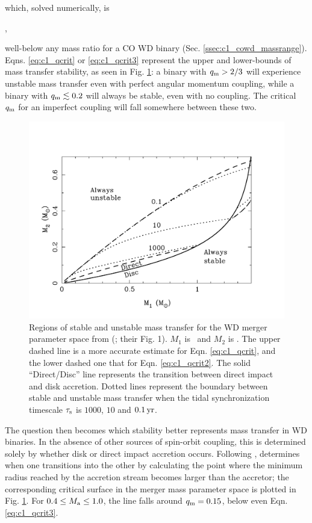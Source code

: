 \noindent which, solved numerically, is

\eqbegin
\qm{},
\label{eq:c1_qcrit3}
\eqend

\noindent well-below any mass ratio for a CO WD binary (Sec. \ref{ssec:c1_cowd_massrange}).  Eqns. \ref{eq:c1_qcrit} or \ref{eq:c1_qcrit3} represent the upper and lower-bounds of mass transfer stability, as seen in Fig. \ref{fig:c1_stability}: a binary with $\qm > 2/3$ will experience unstable mass transfer even with perfect angular momentum coupling, while a binary with $\qm \lesssim 0.2$ will always be stable, even with no coupling.  The critical $\qm$ for an imperfect coupling will fall somewhere between these two.

\begin{figure}
\centering
\includegraphics[angle=0,width=0.65\columnwidth]{introduction/figures/marsns04_stab.pdf}
\caption{Regions of stable and unstable mass transfer for the WD merger parameter space from \citeauthor{marsns04} (\citeyear{marsns04}; their Fig. 1).  $M_1$ is \Ma\, and $M_2$ is \Md.  The upper dashed line is a more accurate estimate for Eqn. \ref{eq:c1_qcrit}, and the lower dashed one that for Eqn. \ref{eq:c1_qcrit2}.  The solid ``Direct/Disc'' line represents the transition between direct impact and disk accretion.  Dotted lines represent the boundary between stable and unstable mass transfer when the tidal synchronization timescale $\tau_\mathrm{s}$ is $1000$, $10$ and $0.1\,\mathrm{yr}$.}
\label{fig:c1_stability}
\end{figure}

The question then becomes which stability better represents mass transfer in WD binaries.  In the absence of other sources of spin-orbit coupling, this is determined solely by whether disk or direct impact accretion occurs.  Following \cite{lubos75}, \cite{nele+01} determines when one transitions into the other by calculating the point where the minimum radius reached by the accretion stream becomes larger than the accretor; the corresponding critical surface in the merger mass parameter space is plotted in Fig. \ref{fig:c1_stability}.  For $0.4 \leq \Ma \leq 1.0$, the line falls around $\qm = 0.15$, below even Eqn. \ref{eq:c1_qcrit3}.


